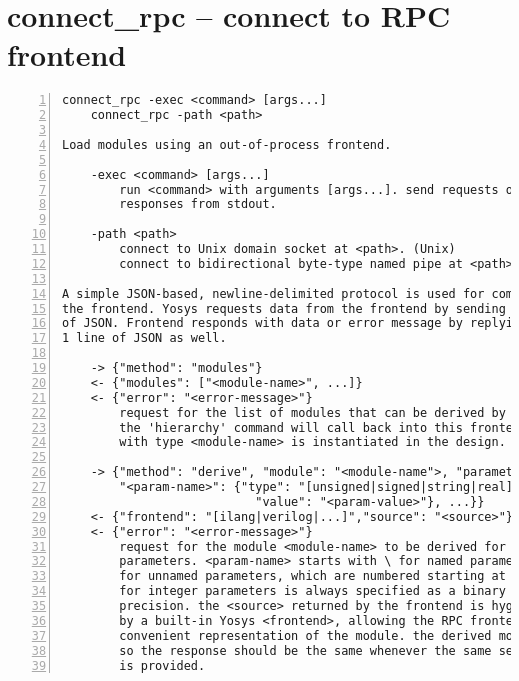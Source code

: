 \section{connect\_rpc -- connect to RPC frontend}
\label{cmd:connect_rpc}
\begin{lstlisting}[numbers=left,frame=single]
    connect_rpc -exec <command> [args...]
    connect_rpc -path <path>

Load modules using an out-of-process frontend.

    -exec <command> [args...]
        run <command> with arguments [args...]. send requests on stdin, read
        responses from stdout.

    -path <path>
        connect to Unix domain socket at <path>. (Unix)
        connect to bidirectional byte-type named pipe at <path>. (Windows)

A simple JSON-based, newline-delimited protocol is used for communicating with
the frontend. Yosys requests data from the frontend by sending exactly 1 line
of JSON. Frontend responds with data or error message by replying with exactly
1 line of JSON as well.

    -> {"method": "modules"}
    <- {"modules": ["<module-name>", ...]}
    <- {"error": "<error-message>"}
        request for the list of modules that can be derived by this frontend.
        the 'hierarchy' command will call back into this frontend if a cell
        with type <module-name> is instantiated in the design.

    -> {"method": "derive", "module": "<module-name">, "parameters": {
        "<param-name>": {"type": "[unsigned|signed|string|real]",
                           "value": "<param-value>"}, ...}}
    <- {"frontend": "[ilang|verilog|...]","source": "<source>"}}
    <- {"error": "<error-message>"}
        request for the module <module-name> to be derived for a specific set of
        parameters. <param-name> starts with \ for named parameters, and with $
        for unnamed parameters, which are numbered starting at 1.<param-value>
        for integer parameters is always specified as a binary string of unlimited
        precision. the <source> returned by the frontend is hygienically parsed
        by a built-in Yosys <frontend>, allowing the RPC frontend to return any
        convenient representation of the module. the derived module is cached,
        so the response should be the same whenever the same set of parameters
        is provided.
\end{lstlisting}

